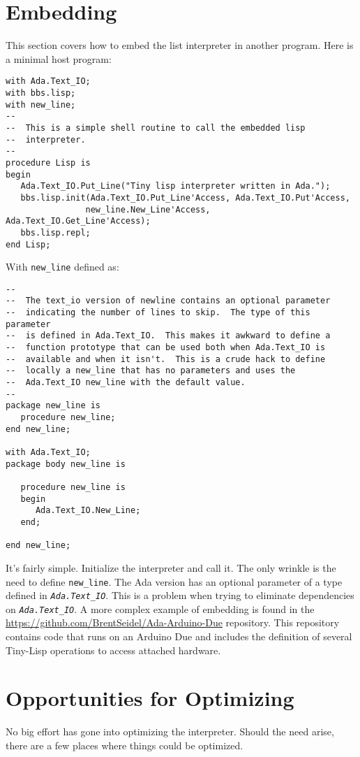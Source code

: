 \documentclass[10pt, openany]{book}
\newcommand{\function}[1]{\texttt{#1}}
\newcommand{\constant}[1]{\emph{\texttt{#1}}}
\newcommand{\tl}{Tiny-Lisp}
\begin{document}
\section{Embedding}
This section covers how to embed the list interpreter in another program.  Here is a minimal host program:
\begin{lstlisting}
with Ada.Text_IO;
with bbs.lisp;
with new_line;
--
--  This is a simple shell routine to call the embedded lisp
--  interpreter.
--
procedure Lisp is
begin
   Ada.Text_IO.Put_Line("Tiny lisp interpreter written in Ada.");
   bbs.lisp.init(Ada.Text_IO.Put_Line'Access, Ada.Text_IO.Put'Access,
                new_line.New_Line'Access, Ada.Text_IO.Get_Line'Access);
   bbs.lisp.repl;
end Lisp;
\end{lstlisting}

With \function{new\_line} defined as:
\begin{lstlisting}
--
--  The text_io version of newline contains an optional parameter
--  indicating the number of lines to skip.  The type of this parameter
--  is defined in Ada.Text_IO.  This makes it awkward to define a
--  function prototype that can be used both when Ada.Text_IO is
--  available and when it isn't.  This is a crude hack to define
--  locally a new_line that has no parameters and uses the
--  Ada.Text_IO new_line with the default value.
--
package new_line is
   procedure new_line;
end new_line;

with Ada.Text_IO;
package body new_line is

   procedure new_line is
   begin
      Ada.Text_IO.New_Line;
   end;

end new_line;
\end{lstlisting}

It's fairly simple.  Initialize the interpreter and call it.  The only wrinkle is the need to define \function{new\_line}.  The Ada version has an optional parameter of a type defined in \constant{Ada.Text\_IO}.  This is a problem when trying to eliminate dependencies on \constant{Ada.Text\_IO}.  A more complex example of embedding is found in the \url{https://github.com/BrentSeidel/Ada-Arduino-Due} repository.  This repository contains code that runs on an Arduino Due and includes the definition of several \tl{} operations to access attached hardware.


\section{Opportunities for Optimizing}
No big effort has gone into optimizing the interpreter.  Should the need arise, there are a few places where things could be optimized.
\end{document}
